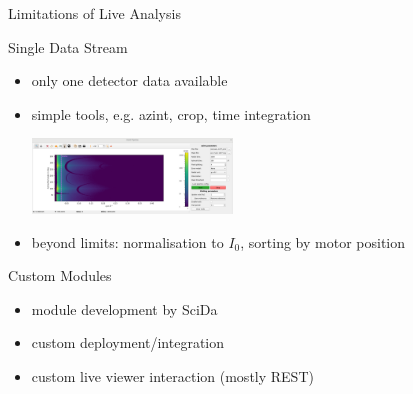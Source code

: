 \documentclass[aspectratio=169]{beamer}
\begin{document}
\begin{frame}{Limitations of Live Analysis}
 \begin{block}{Single Data Stream}
  \begin{itemize}
   \item only one detector data available
   \item simple tools, e.g. azint, crop, time integration

   \includegraphics[height=2cm]{dets/azint}
   \item beyond limits: normalisation to $I_0$, sorting by motor position
  \end{itemize}
 \end{block}
 \begin{block}{Custom Modules}
  \begin{itemize}
   \item module development by SciDa
   \item custom deployment/integration
   \item custom live viewer interaction (mostly REST)
  \end{itemize}
 \end{block}
\end{frame}
\end{document}
